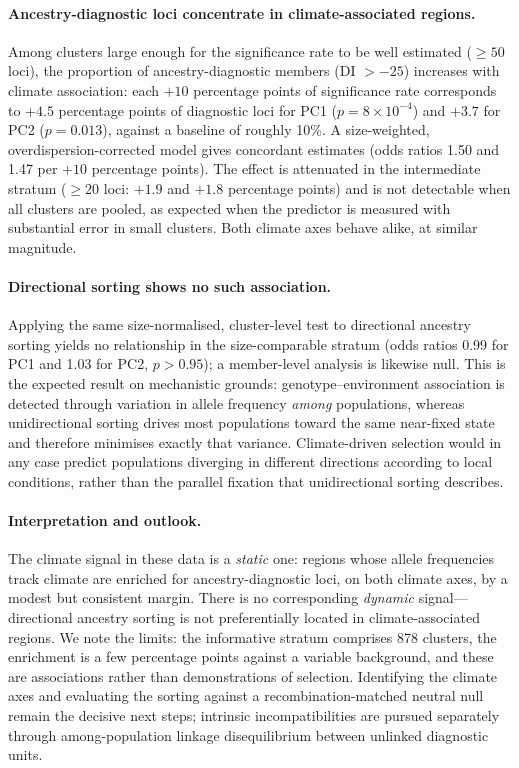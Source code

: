 \documentclass[11pt]{article}
\begin{document}
\paragraph{Ancestry-diagnostic loci concentrate in climate-associated regions.}
Among clusters large enough for the significance rate to be well estimated
($\ge 50$ loci), the proportion of ancestry-diagnostic members (DI $> -25$)
increases with climate association: each $+10$ percentage points of significance
rate corresponds to $+4.5$ percentage points of diagnostic loci for PC1
($p = 8\times10^{-4}$) and $+3.7$ for PC2 ($p = 0.013$), against a baseline of
roughly 10\%. A size-weighted, overdispersion-corrected model gives concordant
estimates (odds ratios 1.50 and 1.47 per $+10$ percentage points). The effect is
attenuated in the intermediate stratum ($\ge 20$ loci: $+1.9$ and $+1.8$
percentage points) and is not detectable when all clusters are pooled, as expected
when the predictor is measured with substantial error in small clusters. Both
climate axes behave alike, at similar magnitude.

\paragraph{Directional sorting shows no such association.}
Applying the same size-normalised, cluster-level test to directional ancestry
sorting yields no relationship in the size-comparable stratum (odds ratios 0.99
for PC1 and 1.03 for PC2, $p > 0.95$); a member-level analysis is likewise null.
This is the expected result on mechanistic grounds: genotype--environment
association is detected through variation in allele frequency \emph{among}
populations, whereas unidirectional sorting drives most populations toward the
same near-fixed state and therefore minimises exactly that variance. Climate-driven
selection would in any case predict populations diverging in different directions
according to local conditions, rather than the parallel fixation that
unidirectional sorting describes.

\paragraph{Interpretation and outlook.}
The climate signal in these data is a \emph{static} one: regions whose allele
frequencies track climate are enriched for ancestry-diagnostic loci, on both
climate axes, by a modest but consistent margin. There is no corresponding
\emph{dynamic} signal---directional ancestry sorting is not preferentially located
in climate-associated regions. We note the limits: the informative stratum
comprises 878 clusters, the enrichment is a few percentage points against a
variable background, and these are associations rather than demonstrations of
selection. Identifying the climate axes and evaluating the sorting against a
recombination-matched neutral null remain the decisive next steps; intrinsic
incompatibilities are pursued separately through among-population linkage
disequilibrium between unlinked diagnostic units.
\end{document}
